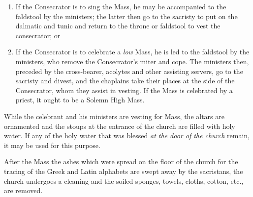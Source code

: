 \documentclass[letterpaper]{report}
\begin{document}
{\begin{enumerate}
        \item If the Consecrator is to sing the Mass, he may be accompanied to the
            faldstool by the ministers; the latter then go to the sacristy to put
            on the dalmatic and tunic and return to the throne or faldstool to vest
            the consecrator; or

        \item If the Consecrator is to celebrate a \textit{low} Mass, he is led to
            the faldstool by the ministers, who remove the Consecrator's miter and
            cope. The ministers then, preceded by the cross-bearer, acolytes and
            other assisting servers, go to the sacristy and divest, and the
            chaplains take their places at the side of the Consecrator, whom they
            assist in vesting. If the Mass is celebrated by a priest, it ought to
            be a Solemn High Mass.
        
    \end{enumerate}

    \rubric While the celebrant and his ministers are vesting for Mass, the altars
    are ornamented and the stoups at the entrance of the church are filled with
    holy water. If any of the holy water that was blessed \textit{at the door of
    the church} remain, it may be used for this purpose.

    \rubric After the Mass the ashes which were spread on the floor of the church
    for the tracing of the Greek and Latin alphabets are swept away by the
    sacristans, the church undergoes a cleaning and the soiled sponges, towels,
    cloths, cotton, etc., are removed.

}
\end{document}
